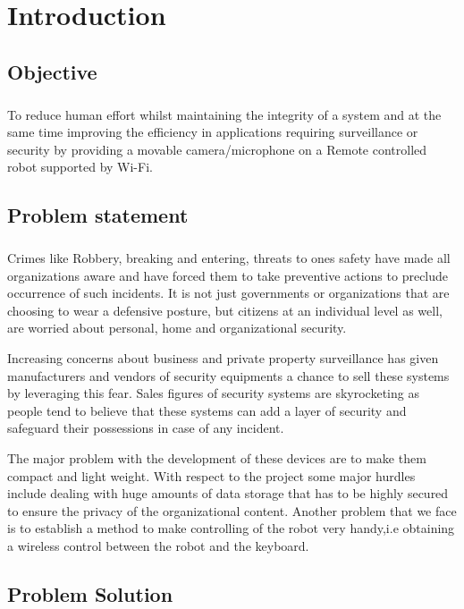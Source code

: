 \chapter{Introduction}
\section{Objective}
\paragraph{}To reduce human effort whilst maintaining the integrity of a system and at the same time improving the efficiency in applications requiring surveillance or security by providing a movable camera/microphone on a Remote controlled robot supported by Wi-Fi.
\section{Problem statement}
\paragraph{}Crimes like Robbery, breaking and entering, threats to ones safety have made all organizations aware and have forced them to take preventive actions to preclude occurrence of such incidents. It is not just governments or organizations that are choosing to wear a defensive posture, but citizens at an individual level as well, are worried about personal, home and organizational security.
\newline

Increasing concerns about business and private property surveillance has given manufacturers and vendors of security equipments a chance to sell these systems by leveraging this fear. Sales figures of security systems are skyrocketing as people tend to believe that these systems can add a layer of security and safeguard their possessions in case of any incident.
\newline

The major problem with the development of these devices are to make them compact and light weight. With respect to the project some major hurdles include dealing with huge amounts of data storage that has to be highly secured to ensure the privacy of the organizational content. Another problem that we face is to establish a method to make controlling of the robot very handy,i.e obtaining a wireless control between the robot and the keyboard.
\section{Problem Solution}
